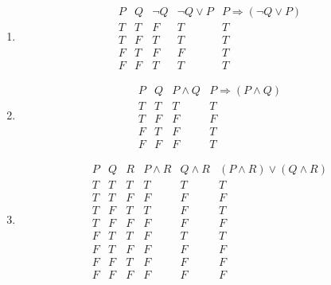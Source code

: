 \begin{enumerate}
 \item[(3.1)]
 \[
  \begin{array}{c|c|c|c|c}
  P & Q & \neg Q & \neg Q \lor P & P \Rightarrow (\neg Q \lor P)\\\hline
  T & T & F & T & T\\
  T & F & T & T & T\\
  F & T & F & F & T\\
  F & F & T & T & T
  \end{array}
  \]

 \item[(3.2)]
  \[
  \begin{array}{c|c|c|c}
  P & Q & P \land Q & P \Rightarrow (P \land Q)\\\hline
  T & T & T & T\\
  T & F & F & F\\
  F & T & F & T\\
  F & F & F & T
  \end{array}
  \]

 \item[(3.3)]
  \[
  \begin{array}{c|c|c|c|c|c}
  P & Q & R & P \land R & Q \land R & (P \land R) \lor (Q \land R)\\\hline
  T & T & T & T & T & T\\
  T & T & F & F & F & F\\
  T & F & T & T & F & T\\
  T & F & F & F & F & F\\
  F & T & T & F & T & T\\
  F & T & F & F & F & F\\
  F & F & T & F & F & F\\
  F & F & F & F & F & F
  \end{array}
  \]
\end{enumerate}

\vspace{1em}
\hrulefill


